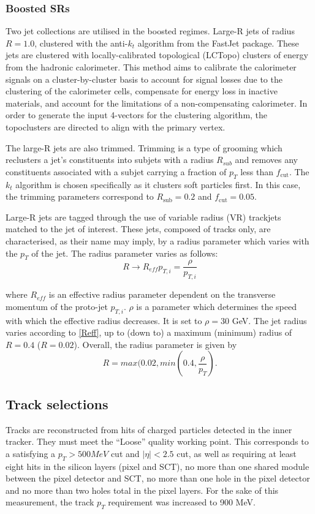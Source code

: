 \documentclass[10pt,a4paper]{book}
\begin{document}
\subsubsection{Boosted SRs}

Two jet collections are utilised in the boosted regimes. Large-R jets of radius $R = 1.0$, clustered with the anti-$k_t$ algorithm from the FastJet package. These jets are clustered with locally-calibrated topological (LCTopo) clusters of energy from the hadronic calorimeter.  This method aims to calibrate the calorimeter signals on a cluster-by-cluster basis to account for signal losses due to the clustering of the calorimeter cells, compensate for energy loss in inactive materials, and account for the limitations of a non-compensating calorimeter. In order to generate the input 4-vectors for the clustering algorithm, the topoclusters are directed to align with the primary vertex.

The large-R jets are also trimmed. Trimming is a type of grooming which reclusters a jet's constituents into subjets with a radius $R_{sub}$ and removes any constituents associated with a subjet carrying a fraction of $p_T$ less than $f_\mathrm{cut}$. The $k_t$ algorithm is chosen specifically as it clusters soft particles first. In this case, the trimming parameters correspond to $R_{\mathrm{sub}} = 0.2$ and $f_{\mathrm{cut}} = 0.05$. 

Large-R jets are tagged through the use of variable radius (VR) trackjets matched to the jet of interest. These jets, composed of tracks only, are characterised, as their name may imply, by a radius parameter which varies with the $p_T$ of the jet. The radius parameter varies as follows:
\begin{equation}
R \rightarrow R_{eff}{p_{T,i}} = \frac{\rho}{p_{T,i}}
\label{Reff}
\end{equation} 

where $R_{eff}$ is an effective radius parameter dependent on the transverse momentum of the proto-jet $p_{T,i}$. $\rho$ is a parameter which determines the speed with which the effective radius decreases. It is set to $\rho = 30$ GeV. The jet radius varies according to \ref{Reff}, up to (down to) a maximum (minimum) radius of $R = 0.4$ ($R = 0.02$). Overall, the radius parameter is given by 
\begin{equation}
R = max(0.02, min(0.4, \frac{\rho}{p_T}).
\end{equation}



\subsection{Track selections}
\label{track sel}
Tracks are reconstructed from hits of charged particles detected in the inner tracker. They must meet the ``Loose'' quality working point. This corresponds to a satisfying a $p_T > 500 MeV$ cut and $\vert \eta \vert < 2.5$ cut, as well as requiring at least eight hits in the silicon layers (pixel and SCT), no more than one shared module between the pixel detector and SCT, no more than one hole in the pixel detector and no more than two holes total in the pixel layers. For the sake of this measurement, the track $p_T$ requirement was increased to 900 MeV.
\end{document}
